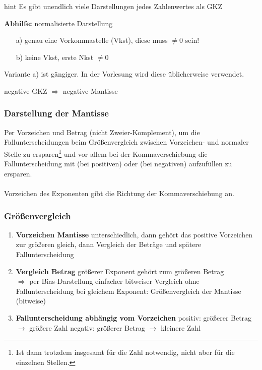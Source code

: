 \documentclass[10pt,a4paper]{scrartcl}
\begin{document}
\begin{Hint}{}{hint}
	Es gibt unendlich viele Darstellungen jedes Zahlenwertes als \ac{GKZ}
\end{Hint}

\textbf{Abhilfe:} normalisierte Darstellung
\begin{itemize}
	\item[a)]  genau eine Vorkommastelle (Vkst), diese muss $ \neq 0 $ sein!
	\item[b)] keine Vkst, erste Nkst $ \neq 0 $
\end{itemize}

Variante a) ist gängiger. In der Vorlesung wird diese üblicherweise verwendet.\\
\begin{center}
	\textcolor{blue!60}{negative \ac{GKZ} $ \Rightarrow $ negative Mantisse} \\
\end{center}
\noindent
\subsubsection*{Darstellung der Mantisse}
Per Vorzeichen und Betrag (nicht Zweier-Komplement), um die Fallunterscheidungen beim Größenvergleich zwischen Vorzeichen- und normaler Stelle zu ersparen\footnote{Ist dann trotzdem insgesamt für die Zahl notwendig, nicht aber für die einzelnen Stellen.} und vor allem bei der Kommaverschiebung die Fallunterscheidung mit \grqq{} (bei positiven) oder \grqq{} (bei negativen) aufzufüllen zu ersparen.\\
\\
Vorzeichen des Exponenten gibt die Richtung der Kommaverschiebung an.\\

\subsubsection*{Größenvergleich}
\begin{enumerate}
	\itemsep0.5em
	\item \textbf{Vorzeichen Mantisse}
		\subitem unterschiedlich, dann gehört das positive Vorzeichen zur größeren
		\subitem gleich, dann Vergleich der Beträge und spätere Fallunterscheidung
	\item \textbf{Vergleich Betrag}
		\subitem größerer Exponent gehört zum größeren Betrag \\
			\hspace*{10mm} $ \Rightarrow $ per Bias-Darstellung einfacher bitweiser Vergleich ohne Fallunterscheidung
		\subitem bei gleichem Exponent: Größenvergleich der Mantisse (bitweise)
	\item \textbf{Fallunterscheidung abhängig vom Vorzeichen}
		\subitem positiv: größerer Betrag $ \rightarrow $ größere Zahl
		\subitem negativ: größerer Betrag $ \rightarrow $ kleinere Zahl
\end{enumerate}
\end{document}
